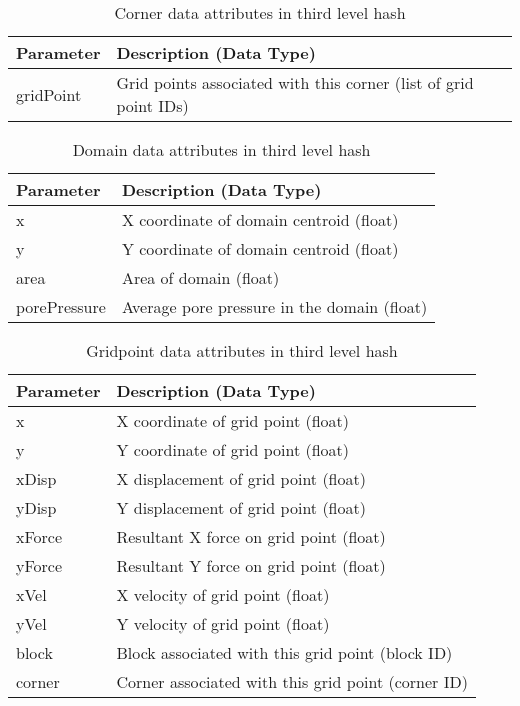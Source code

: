 \begin{table}[!htb]
\centering
\caption{Corner data attributes in third level hash}
\label{tab3}
\begin{tabularx}{\textwidth}{@{}Yp{0.75\textwidth}@{}}
\toprule
\textbf{Parameter} & \textbf{Description (Data Type)}                                 \\ \midrule
gridPoint          & Grid points associated with this corner (list of grid point IDs) \\ \bottomrule
\end{tabularx}
\end{table}

\begin{table}[!htb]
\centering
\caption{Domain data attributes in third level hash}
\label{tab4}
\begin{tabularx}{\textwidth}{@{}Yp{0.75\textwidth}@{}}
\toprule
\textbf{Parameter} & \textbf{Description (Data Type)}            \\ \midrule
x       & X coordinate of domain centroid (float)     \\
y       & Y coordinate of domain centroid (float)     \\
area               & Area of domain (float)                      \\
porePressure      & Average pore pressure in the domain (float)\\ \bottomrule
\end{tabularx}
\end{table}

\begin{table}[!htb]
\centering
\caption{Gridpoint data attributes in third level hash}
\label{tab5}
\begin{tabularx}{\textwidth}{@{}Yp{0.75\textwidth}@{}}
\toprule
\textbf{Parameter} & \textbf{Description (Data Type)}                             \\ \midrule
x       & X coordinate of grid point (float)                           \\
y       & Y coordinate of grid point (float)                           \\
xDisp     & X displacement of grid point (float)                         \\
yDisp     & Y displacement of grid point (float)                         \\
xForce            & Resultant X force on grid point (float)                      \\
yForce            & Resultant Y force on grid point (float)                      \\
xVel         & X velocity of grid point (float)                             \\
yVel         & Y velocity of grid point (float)                             \\
block              & Block associated with this grid point (block ID)   \\
corner             & Corner associated with this grid point (corner ID)\\ \bottomrule
\end{tabularx}
\end{table}

